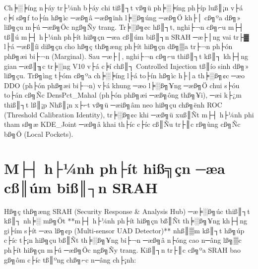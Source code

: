 ﻿\documentclass[../main.tex]{subfiles}
\begin{document}
Ch╞░╞íng n├áy tr├¼nh b├áy chi tiß║┐t vß╗ü ph╞░╞íng ph├íp luß║¡n v├á c╞í sß╗ƒ to├ín hß╗ìc ─æß╗â ─æß╗ïnh l╞░ß╗úng ─æß╗Ö kh├│ cß╗ºa dß╗» liß╗çu m├ú ─æß╗Öc ngß╗Ñy trang. Tr╞░ß╗¢c hß║┐t, nghi├¬n cß╗⌐u m├┤ tß║ú m├┤ h├¼nh ph├ít hiß╗çn ─æa cß║úm biß║┐n SRAH ─æ├│ng vai tr├▓ l├á ─æß║íi diß╗çn cho hß╗ç thß╗æng ph├ít hiß╗çn dß╗▒a tr├¬n ph├ón phß╗æi bi├¬n (Marginal). Sau ─æ├│, nghi├¬n cß╗⌐u thiß║┐t kß║┐ kh├┤ng gian ─æß║╖c tr╞░ng V10 v├á c╞í chß║┐ Controlled Injection tß║ío sinh dß╗» liß╗çu. Trß╗ìng t├óm cß╗ºa ch╞░╞íng l├á to├ín hß╗ìc h├│a th╞░ß╗¢c ─æo DDO (ph├ón phß╗æi bi├¬n) v├á khung ─æo l╞░ß╗¥ng ─æß╗Ö chui s├óu to├án cß╗Ñc DensPct\_Mahal (ph├ón phß╗æi ─æß╗ông thß╗¥i), ─æi k├¿m thiß║┐t lß║¡p Nhß║¡n x├⌐t vß╗ü ─æiß╗âm neo hiß╗çu chß╗ënh ROC (Threshold Calibration Identity), tr╞░ß╗¢c khi ─æß╗ü xuß║Ñt m├┤ h├¼nh phi tham sß╗æ KDE\_Joint ─æß╗â khai th├íc c├íc cß║Ñu tr├║c rß╗ùng cß╗Ñc bß╗Ö (Local Pockets).

\section{M├┤ h├¼nh ph├ít hiß╗çn ─æa cß║úm biß║┐n SRAH}
\label{section:2.1}

Hß╗ç thß╗æng SRAH (Security Response \& Analysis Hub) ─æ╞░ß╗úc thiß║┐t kß║┐ nh╞░ mß╗Öt **m├┤ h├¼nh ph├ít hiß╗çn bß║Ñt th╞░ß╗¥ng kh├┤ng gi├ím s├ít ─æa lß╗¢p (Multi-sensor UAD Detector)** nhß║▒m kß║┐t hß╗úp c├íc t├¡n hiß╗çu bß║Ñt th╞░ß╗¥ng bi├¬n ─æß╗â n├óng cao n─âng lß╗▒c ph├ít hiß╗çn m├ú ─æß╗Öc ngß╗Ñy trang. Kiß║┐n tr├║c cß╗ºa SRAH bao gß╗ôm c├íc tß║ºng chß╗⌐c n─âng ch├¡nh:
\end{document}
